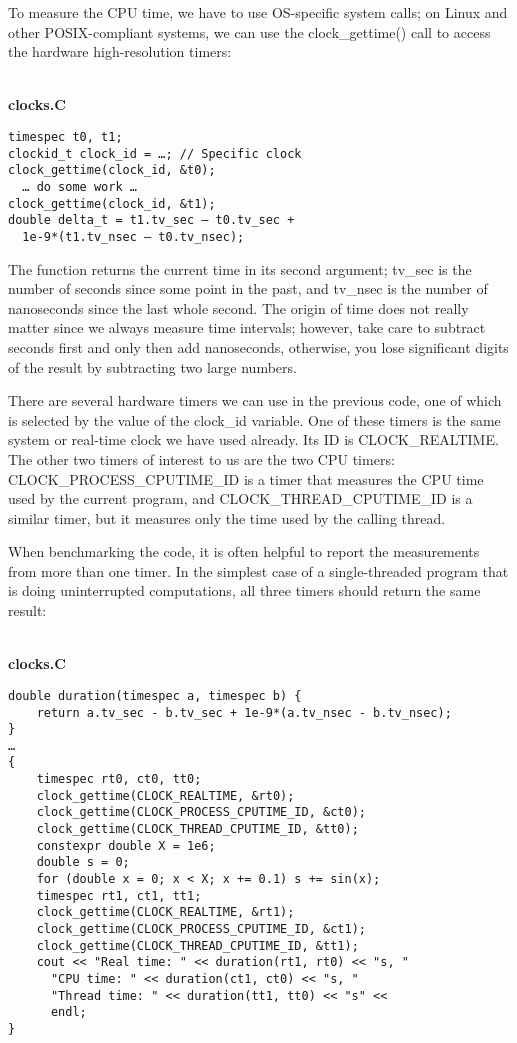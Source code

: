 
To measure the CPU time, we have to use OS-specific system calls; on Linux and other POSIX-compliant systems, we can use the clock\_gettime() call to access the hardware high-resolution timers:

\hspace*{\fill} \\ %
\noindent
\textbf{clocks.C}
\begin{lstlisting}[style=styleCXX]
timespec t0, t1;
clockid_t clock_id = …; // Specific clock
clock_gettime(clock_id, &t0);
  … do some work …
clock_gettime(clock_id, &t1);
double delta_t = t1.tv_sec – t0.tv_sec +
  1e-9*(t1.tv_nsec – t0.tv_nsec);
\end{lstlisting}

The function returns the current time in its second argument; tv\_sec is the number of seconds since some point in the past, and tv\_nsec is the number of nanoseconds since the last whole second. The origin of time does not really matter since we always measure time intervals; however, take care to subtract seconds first and only then add nanoseconds, otherwise, you lose significant digits of the result by subtracting two large numbers.

There are several hardware timers we can use in the previous code, one of which is selected by the value of the clock\_id variable. One of these timers is the same system or real-time clock we have used already. Its ID is CLOCK\_REALTIME. The other two timers of interest to us are the two CPU timers: CLOCK\_PROCESS\_CPUTIME\_ID is a timer that measures the CPU time used by the current program, and CLOCK\_THREAD\_CPUTIME\_ID is a similar timer, but it measures only the time used by the calling thread.

When benchmarking the code, it is often helpful to report the measurements from more than one timer. In the simplest case of a single-threaded program that is doing uninterrupted computations, all three timers should return the same result:

\hspace*{\fill} \\ %
\noindent
\textbf{clocks.C}
\begin{lstlisting}[style=styleCXX]
double duration(timespec a, timespec b) {
	return a.tv_sec - b.tv_sec + 1e-9*(a.tv_nsec - b.tv_nsec);
}
…
{
	timespec rt0, ct0, tt0;
	clock_gettime(CLOCK_REALTIME, &rt0);
	clock_gettime(CLOCK_PROCESS_CPUTIME_ID, &ct0);
	clock_gettime(CLOCK_THREAD_CPUTIME_ID, &tt0);
	constexpr double X = 1e6;
	double s = 0;
	for (double x = 0; x < X; x += 0.1) s += sin(x);
	timespec rt1, ct1, tt1;
	clock_gettime(CLOCK_REALTIME, &rt1);
	clock_gettime(CLOCK_PROCESS_CPUTIME_ID, &ct1);
	clock_gettime(CLOCK_THREAD_CPUTIME_ID, &tt1);
	cout << "Real time: " << duration(rt1, rt0) << "s, "
	  "CPU time: " << duration(ct1, ct0) << "s, "
	  "Thread time: " << duration(tt1, tt0) << "s" <<
	  endl;
}
\end{lstlisting}

